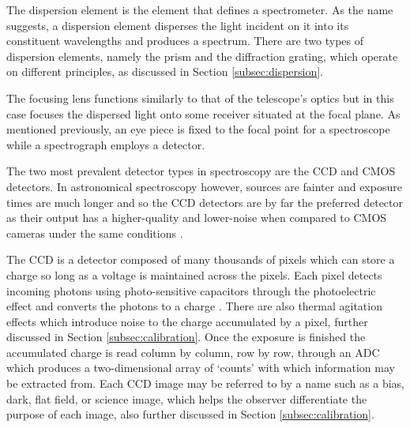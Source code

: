 

The dispersion element is the element that defines a spectrometer. As the name suggests, a dispersion element disperses the light incident on it into its constituent wavelengths and produces a spectrum. There are two types of dispersion elements, namely the prism and the diffraction grating, which operate on different principles, as discussed in Section \ref{subsec:dispersion}.
\prgph

The focusing lens functions similarly to that of the telescope's optics but in this case focuses the dispersed light onto some receiver situated at the focal plane. As mentioned previously, an eye piece is fixed to the focal point for a spectroscope while a spectrograph employs a detector.
\prgph

The two most prevalent detector types in spectroscopy are the \gls{CCD} and \gls{CMOS} detectors. In astronomical spectroscopy however, sources are fainter and exposure times are much longer and so the \gls{CCD} detectors are by far the preferred detector as their output has a higher-quality and lower-noise when compared to \gls{CMOS} cameras under the same conditions \citep{CCDvsCMOS}.
\prgph

The \gls{CCD} is a detector composed of many thousands of pixels which can store a charge so long as a voltage is maintained across the pixels. Each pixel detects incoming photons using photo-sensitive capacitors through the photoelectric effect and converts the photons to a charge \citep{CCDastronomy}. There are also thermal agitation effects which introduce noise to the charge accumulated by a pixel, further discussed in Section \ref{subsec:calibration}. Once the exposure is finished the accumulated charge is read column by column, row by row, through an \gls{ADC}  which produces a two-dimensional array of `counts' with which information may be extracted from. Each \gls{CCD} image may be referred to by a name such as a bias, dark, flat field, or science image, which helps the observer differentiate the purpose of each image, also further discussed in Section \ref{subsec:calibration}.

